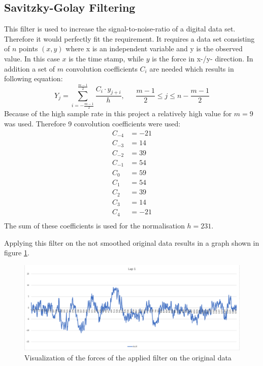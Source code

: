 \subsection{Savitzky-Golay Filtering}
This filter is used to increase the signal-to-noise-ratio of a digital data set\cite{sg}. Therefore it would perfectly fit the requirement. It requires a data set consisting of $n$ points $(x,y)$ where x is an independent variable and y is the observed value. In this case $x$ is the time stamp, while $y$ is the force in x-/y- direction. In addition a set of $m$ convolution coefficients $C_i$ are needed which results in following equation:
\begin{equation*}
	Y_j = \sum_{i=-\frac{m-1}{2}}^{\frac{m-1}{2}}\dfrac{C_i\cdot y_{j+i}}{h},~~~~~~~ \dfrac{m-1}{2}\leq j \leq n-\dfrac{m-1}{2}
\end{equation*}
Because of the high sample rate in this project a relatively high value for $m=9$ was used. Therefore 9 convolution coefficients were used:
\begin{equation*}
	\begin{split}
	C_{-4} & = -21\\
	C_{-3} & = 14\\
	C_{-2} & = 39\\
	C_{-1} & = 54\\
	C_{0} & = 59   \\
	C_{1} & = 54     \\
	C_{2} & = 39     \\
	C_{3} & = 14     \\
	C_{4} & = -21    \\
	\end{split}
\end{equation*}
The sum of these coefficients is used for the normalisation $h=231$.

Applying this filter on the not smoothed original data results in a graph shown in figure \ref{fig:sgoriFor}.

\begin{figure}[H]
	\centering
	\includegraphics[scale= 0.45]{Pictures/sgoriForces.png}
	\caption{Visualization of the forces of the applied filter on the original data}
	\label{fig:sgoriFor}
\end{figure}

